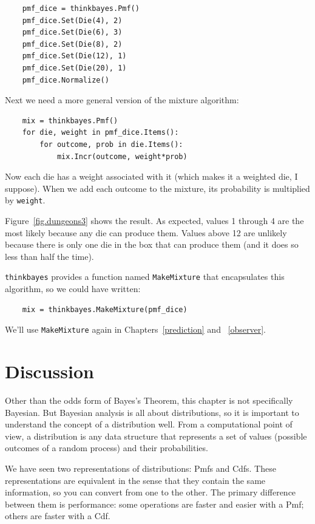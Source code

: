\documentclass[12pt]{book}
\begin{document}
\begin{verbatim}
    pmf_dice = thinkbayes.Pmf()
    pmf_dice.Set(Die(4), 2)
    pmf_dice.Set(Die(6), 3)
    pmf_dice.Set(Die(8), 2)
    pmf_dice.Set(Die(12), 1)
    pmf_dice.Set(Die(20), 1)
    pmf_dice.Normalize()
\end{verbatim}

Next we need a more general version of the mixture algorithm:

\begin{verbatim}
    mix = thinkbayes.Pmf()
    for die, weight in pmf_dice.Items():
        for outcome, prob in die.Items():
            mix.Incr(outcome, weight*prob)
\end{verbatim}

Now each die has a weight associated with it (which makes it a
weighted die, I suppose).  When we add each outcome to the mixture,
its probability is multiplied by {\tt weight}.

Figure~\ref{fig.dungeons3} shows the result.  As expected, values 1
through 4 are the most likely because any die can produce them.
Values above 12 are unlikely because there is only one die in the box
that can produce them (and it does so less than half the time).

{\tt thinkbayes} provides a function named {\tt MakeMixture}
that encapsulates this algorithm, so we could have written:

\begin{verbatim}
    mix = thinkbayes.MakeMixture(pmf_dice)
\end{verbatim}

We'll use {\tt MakeMixture} again in Chapters~\ref{prediction} and
~\ref{observer}.


\section{Discussion}

Other than the odds form of Bayes's Theorem, this chapter is not
specifically Bayesian.  But Bayesian analysis is all about
distributions, so it is important to understand the concept of a
distribution well.  From a computational point of view, a distribution
is any data structure that represents a set of values (possible
outcomes of a random process) and their probabilities.

We have seen two representations of distributions: Pmfs and Cdfs.
These representations are equivalent in the sense that they contain
the same information, so you can convert from one to the other.  The
primary difference between them is performance: some operations are
faster and easier with a Pmf; others are faster with a Cdf.
 
\end{document}
